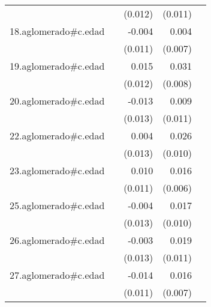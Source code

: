 {\begin{longtable}{l*{4}{D{.}{.}{-1}}}
            &                     &     (0.012)         &     (0.011)         &                     \\
\addlinespace
18.aglomerado#c.edad&                     &      -0.004         &       0.004         &                     \\
            &                     &     (0.011)         &     (0.007)         &                     \\
\addlinespace
19.aglomerado#c.edad&                     &       0.015         &       0.031\sym{***}&                     \\
            &                     &     (0.012)         &     (0.008)         &                     \\
\addlinespace
20.aglomerado#c.edad&                     &      -0.013         &       0.009         &                     \\
            &                     &     (0.013)         &     (0.011)         &                     \\
\addlinespace
22.aglomerado#c.edad&                     &       0.004         &       0.026\sym{**} &                     \\
            &                     &     (0.013)         &     (0.010)         &                     \\
\addlinespace
23.aglomerado#c.edad&                     &       0.010         &       0.016\sym{*}  &                     \\
            &                     &     (0.011)         &     (0.006)         &                     \\
\addlinespace
25.aglomerado#c.edad&                     &      -0.004         &       0.017         &                     \\
            &                     &     (0.013)         &     (0.010)         &                     \\
\addlinespace
26.aglomerado#c.edad&                     &      -0.003         &       0.019         &                     \\
            &                     &     (0.013)         &     (0.011)         &                     \\
\addlinespace
27.aglomerado#c.edad&                     &      -0.014         &       0.016\sym{*}  &                     \\
            &                     &     (0.011)         &     (0.007)         &                     \\

\end{longtable}}
